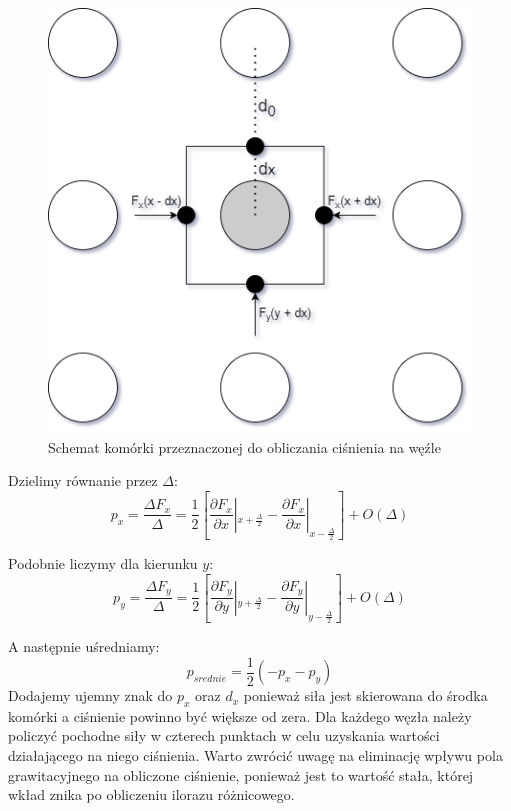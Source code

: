 \documentclass[12pt, letterpaper]{report}
\begin{document}
    \begin{figure}
        \includegraphics[width=0.9\linewidth]{pressure_box}
        \caption{Schemat komórki przeznaczonej do obliczania ciśnienia na węźle}
    \end{figure}

    Dzielimy równanie przez $\Delta$:
    \begin{equation}
        p_x = \frac{\Delta F_x}{\Delta} = \frac{1}{2} 
        \left[ \frac{\partial F_x}{\partial x} |_{x + \frac{\Delta}{2}} - \frac{\partial F_x}{\partial x} |_{x - \frac{\Delta}{2}} \right] + O(\Delta)
    \end{equation}

    Podobnie liczymy dla kierunku $y$:
    \begin{equation}
        p_y = \frac{\Delta F_y}{\Delta} = \frac{1}{2} 
        \left[ \frac{\partial F_y}{\partial y} |_{y + \frac{\Delta}{2}} - \frac{\partial F_y}{\partial y} |_{y - \frac{\Delta}{2}} \right] + O(\Delta)
    \end{equation}

    A następnie uśredniamy:
    \begin{equation}
        p_{srednie} = \frac{1}{2} \left( -p_x - p_y \right)
    \end{equation}
    Dodajemy ujemny znak do $p_x$ oraz $d_x$ ponieważ siła jest skierowana do środka komórki a 
    ciśnienie powinno być większe od zera. Dla każdego węzła należy policzyć pochodne siły w czterech punktach w celu 
    uzyskania wartości działającego na niego ciśnienia. Warto zwrócić uwagę na eliminację wpływu 
    pola grawitacyjnego na obliczone ciśnienie, ponieważ 
    jest to wartość stała, której wkład znika po obliczeniu ilorazu różnicowego.
\end{document}
